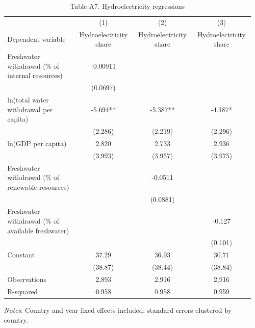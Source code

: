 \begin{table}[htbp]
\centering
\caption{Table A7. Hydroelectricity regressions}
\small
\begin{tabular}{lccc}
\hline
 & (1) & (2) & (3) \\
Dependent variable & Hydroelectricity share & Hydroelectricity share & Hydroelectricity share \\
\hline
Freshwater withdrawal (\% of internal resources) & -0.00911 &  &  \\
 & (0.0697) &  &  \\
ln(total water withdrawal per capita) & -5.694** & -5.387** & -4.187* \\
 & (2.286) & (2.219) & (2.296) \\
ln(GDP per capita) & 2.820 & 2.733 & 2.936 \\
 & (3.993) & (3.957) & (3.975) \\
Freshwater withdrawal (\% of renewable resources) &  & -0.0511 &  \\
 &  & (0.0881) &  \\
Freshwater withdrawal (\% of available freshwater) &  &  & -0.127 \\
 &  &  & (0.101) \\
Constant & 37.29 & 36.93 & 30.71 \\
 & (38.87) & (38.44) & (38.84) \\
\hline
Observations & 2,893 & 2,916 & 2,916 \\
R-squared & 0.958 & 0.958 & 0.959 \\
\hline
\end{tabular}
\vspace{0.5em}
\parbox{0.95\textwidth}{\footnotesize \textit{Notes}: Country and year fixed effects included; standard errors clustered by country.}
\end{table}
